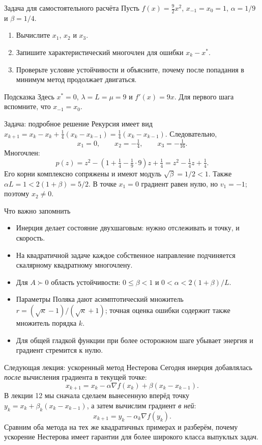 \documentclass[aspectratio=169,10pt]{beamer}
\newcommand{\grad}{\nabla}
\begin{document}
\begin{frame}{Задача для самостоятельного расчёта}
\small
Пусть $f(x)=\tfrac92x^2$, $x_{-1}=x_0=1$, $\alpha=1/9$ и $\beta=1/4$.
\begin{enumerate}
\item Вычислите $x_1$, $x_2$ и $x_3$.
\item Запишите характеристический многочлен для ошибки $x_k-x^*$.
\item Проверьте условие устойчивости и объясните, почему после попадания в минимум метод продолжает двигаться.
\end{enumerate}
\begin{block}{Подсказка}
Здесь $x^*=0$, $\lambda=L=\mu=9$ и $f'(x)=9x$. Для первого шага вспомните, что $x_{-1}=x_0$.
\end{block}
\end{frame}

\begin{frame}{Задача: подробное решение}
\small
Рекурсия имеет вид
$x_{k+1}=x_k-x_k+\tfrac14(x_k-x_{k-1})
=\tfrac14(x_k-x_{k-1})$.
Следовательно,
\[
x_1=0,\qquad x_2=-\tfrac14,\qquad x_3=-\tfrac1{16}.
\]
Многочлен:
\[
p(z)=z^2-\left(1+\tfrac14-\tfrac19\cdot9\right)z+\tfrac14
=z^2-\tfrac14z+\tfrac14.
\]
Его корни комплексно сопряжены и имеют модуль $\sqrt\beta=1/2<1$. Также
$\alpha L=1<2(1+\beta)=5/2$.
В точке $x_1=0$ градиент равен нулю, но $v_1=-1$; поэтому $x_2\ne0$.
\end{frame}

\begin{frame}{Что важно запомнить}
\small
\begin{itemize}
\item Инерция делает состояние двухшаговым: нужно отслеживать и точку, и скорость.
\item На квадратичной задаче каждое собственное направление подчиняется скалярному квадратному многочлену.
\item Для $A\succ0$ область устойчивости: $0\le\beta<1$ и $0<\alpha<2(1+\beta)/L$.
\item Параметры Поляка дают асимптотический множитель
$r=(\sqrt\kappa-1)/(\sqrt\kappa+1)$; точная оценка ошибки содержит также множитель порядка $k$.
\item Для общей гладкой функции при более осторожном шаге убывает энергия и градиент стремится к нулю.
\end{itemize}
\end{frame}

\begin{frame}{Следующая лекция: ускоренный метод Нестерова}
\small
Сегодня инерция добавлялась \emph{после} вычисления градиента в текущей точке:
\[
x_{k+1}=x_k-\alpha\grad f(x_k)+\beta(x_k-x_{k-1}).
\]
В лекции 12 мы сначала сделаем вынесенную вперёд точку
$y_k=x_k+\beta_k(x_k-x_{k-1})$, а затем вычислим градиент \emph{в ней}:
\[
x_{k+1}=y_k-\alpha_k\grad f(y_k).
\]
Сравним оба метода на тех же квадратичных примерах и разберём, почему ускорение Нестерова имеет гарантии для более широкого класса выпуклых задач.
\end{frame}
\end{document}
